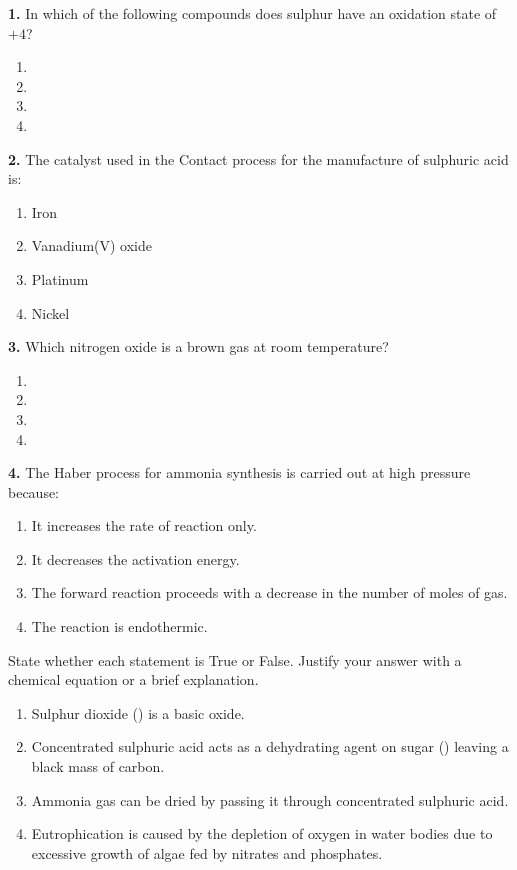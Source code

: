 \documentclass[11pt]{article}
\begin{document}
\begin{exercice}
\textbf{1.} In which of the following compounds does sulphur have an oxidation state of $+4$?
\begin{enumerate}[label=\Alph*.]
\item {}
\item {}
\item {}
\item {}
\end{enumerate}

\textbf{2.} The catalyst used in the Contact process for the manufacture of sulphuric acid is:
\begin{enumerate}[label=\Alph*.]
\item Iron
\item Vanadium(V) oxide
\item Platinum
\item Nickel
\end{enumerate}

\textbf{3.} Which nitrogen oxide is a brown gas at room temperature?
\begin{enumerate}[label=\Alph*.]
\item {}
\item {}
\item {}
\item {}
\end{enumerate}

\textbf{4.} The Haber process for ammonia synthesis is carried out at high pressure because:
\begin{enumerate}[label=\Alph*.]
\item It increases the rate of reaction only.
\item It decreases the activation energy.
\item The forward reaction proceeds with a decrease in the number of moles of gas.
\item The reaction is endothermic.
\end{enumerate}
\end{exercice}

\begin{exercice}
State whether each statement is True or False. Justify your answer with a chemical equation or a brief explanation.
\begin{enumerate}
\item Sulphur dioxide () is a basic oxide.
\item Concentrated sulphuric acid acts as a dehydrating agent on sugar () leaving a black mass of carbon.
\item Ammonia gas can be dried by passing it through concentrated sulphuric acid.
\item Eutrophication is caused by the depletion of oxygen in water bodies due to excessive growth of algae fed by nitrates and phosphates.
\end{enumerate}
\end{exercice}
\end{document}
